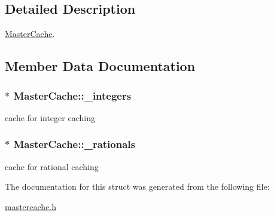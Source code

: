 \subsection{Detailed Description}
\hyperlink{structMasterCache}{Master\+Cache}. 

\subsection{Member Data Documentation}
\subsubsection[{\texorpdfstring{\+\_\+integers}{_integers}}]{$\ast$ Master\+Cache\+::\+\_\+integers}\hypertarget{structMasterCache_a5c3a0aa848b8d98114902f674e111dc3}{}\label{structMasterCache_a5c3a0aa848b8d98114902f674e111dc3}
cache for integer caching 
\subsubsection[{\texorpdfstring{\+\_\+rationals}{_rationals}}]{$\ast$ Master\+Cache\+::\+\_\+rationals}\hypertarget{structMasterCache_a2cc414dcdfc90d3841ffa329f0877f67}{}\label{structMasterCache_a2cc414dcdfc90d3841ffa329f0877f67}
cache for rational caching 

The documentation for this struct was generated from the following file\+:\begin{DoxyCompactItemize}
\item 
\hyperlink{mastercache_8h}{mastercache.\+h}\end{DoxyCompactItemize}
